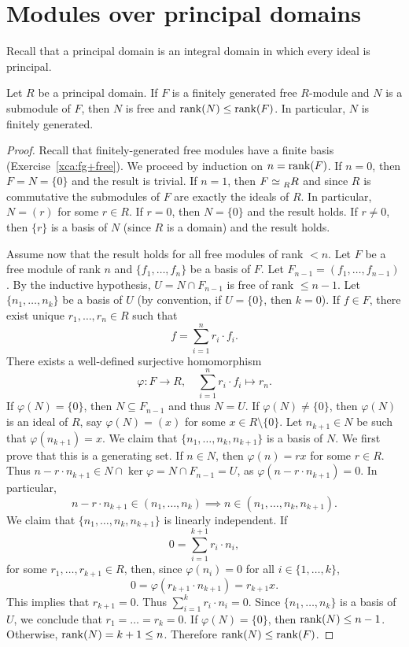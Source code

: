 \section{Modules over principal domains}
\lecture\label{lec:ModulesPD}

Recall that a principal domain is an integral domain in which
every ideal is principal.

\begin{theorem}
\label{thm:rango}
Let $R$ be a principal domain. If $F$ is a finitely generated free $R$-module and 
$N$ is a submodule of $F$, then $N$ is free and 
$\operatorname{rank}(N)\leq\operatorname{rank}(F)$. In particular, $N$ is finitely generated. 
\end{theorem}

\begin{proof}
    Recall that finitely-generated free modules have a finite basis
    (Exercise~\ref{xca:fg+free}). 
	We proceed by induction on $n=\operatorname{rank}(F)$. 
  If $n=0$, then
  $F=N=\{0\}$ and the result is trivial.
  If $n=1$, then
	$F\simeq\prescript{}{R}R$ 
	and since $R$ is commutative the submodules of $F$ are exactly the ideals of $R$. In particular,
	$N=(r)$ for some $r\in R$. If $r=0$, then $N=\{0\}$ and the result holds. If $r\ne 0$, then 
	$\{r\}$ is a basis of $N$ (since $R$ is a domain) and the result holds.
	
	Assume now that the result holds for all free modules of rank $<n$. Let $F$ be a free module of
	rank $n$ and 
  $\{f_1,\dots,f_n\}$ be a basis of $F$. Let $F_{n-1}=(f_1,\dots,f_{n-1})$. By the inductive hypothesis, 
  $U=N\cap F_{n-1}$ is free of rank $\leq n-1$. Let 
	$\{n_1,\dots,n_k\}$ be a basis of $U$ (by convention, if $U=\{0\}$, then $k=0$). If 
	$f\in F$, there exist unique $r_1,\dots,r_n\in R$ such that  
	\[
	f=\sum_{i=1}^n r_i\cdot f_i.
	\]
	There exists a well-defined surjective homomorphism 
	\[
	\varphi\colon F\to R,
	\quad
	\sum_{i=1}^nr_i\cdot f_i\mapsto r_n.
	\] 
	If $\varphi(N)=\{0\}$, then $N\subseteq F_{n-1}$ and thus $N=U$. 
	If $\varphi(N)\ne\{0\}$, then $\varphi(N)$ is an ideal of 
	$R$, say $\varphi(N)=(x)$ for some $x\in R\setminus\{0\}$. Let $n_{k+1}\in N$ 
	be such that $\varphi(n_{k+1})=x$. 
    We claim that $\{n_1,\dots,n_k,n_{k+1}\}$ is a basis of $N$. We first prove that 
    this is a generating set. 
	If $n\in N$, then $\varphi(n)=rx$ 
  for some $r\in R$. Thus $n-r\cdot n_{k+1}\in N\cap\ker\varphi=N\cap F_{n-1}=U$, as  
	$\varphi(n-r\cdot n_{k+1})=0$. In particular, 
	\[
	n-r\cdot n_{k+1}\in (n_1,\dots,n_k)\implies  
	n\in (n_1,\dots,n_k,n_{k+1}).
	\]
	We claim that 
	$\{n_1,\dots,n_k,n_{k+1}\}$ is linearly independent. If 
	\[
	0=\sum_{i=1}^{k+1}r_i\cdot n_i,
	\]
	for some $r_1,\dots,r_{k+1}\in R$, then, since 
	$\varphi(n_i)=0$ for all $i\in\{1,\dots,k\}$,
	\[
	0=\varphi(r_{k+1}\cdot n_{k+1})=r_{k+1}x.
	\]
	This implies that $r_{k+1}=0$. Thus $\sum_{i=1}^kr_i\cdot n_i=0$. Since
	$\{n_1,\dots,n_k\}$ is a basis of $U$, we conclude that 
	$r_1=\dots=r_k=0$. 
  If $\varphi(N)=\{0\}$, then $\operatorname{rank}(N)\leq n-1$. Otherwise,
  $\operatorname{rank}(N)=k+1\leq n$. Therefore $\operatorname{rank}(N)\leq\operatorname{rank}(F)$.
\end{proof}

